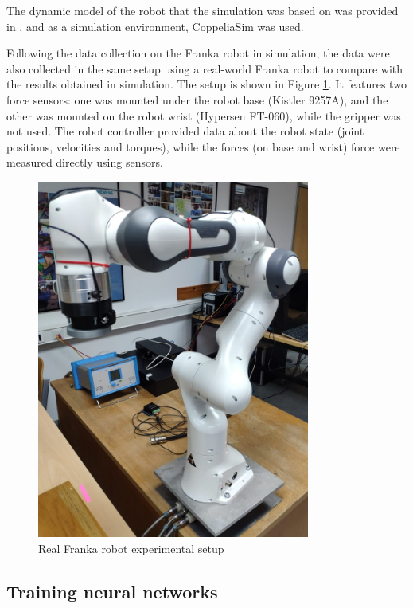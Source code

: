 The dynamic model of the robot that the simulation was based on was provided in \cite{Gaz2019}, and as a simulation environment, CoppeliaSim \cite{Rohmer2013} was used.

Following the data collection on the Franka robot in simulation, the data were also collected in the same setup using a real-world Franka robot to compare with the results obtained in simulation. The setup is shown in Figure \ref{fig:FrankaExp}. It features two force sensors: one was mounted under the robot base (Kistler 9257A), and the other was mounted on the robot wrist (Hypersen FT-060), while the gripper was not used. The robot controller provided data about the robot state (joint positions, velocities and torques), while the forces (on base and wrist) force were measured directly using sensors.

\begin{figure}
    \centering
    \includegraphics[width=0.8\textwidth]{slike/franka_exp.jpg}
    \caption{Real Franka robot experimental setup}
    \label{fig:FrankaExp}
\end{figure}

\subsection{Training neural networks}

